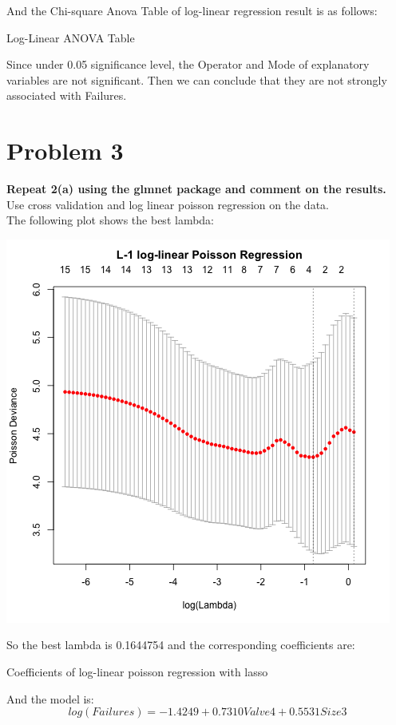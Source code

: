 \documentclass[10pt,letterpaper]{article}
\begin{document}
\begin{enumerate}[leftmargin=0cm,itemindent=.5cm,labelwidth=\itemindent,labelsep=0cm,align=left]
And the Chi-square Anova Table of log-linear regression result is as follows:
\begin{center}
\small{Log-Linear ANOVA Table}
\end{center}
Since under 0.05 significance level, the Operator and Mode of explanatory variables are not significant. Then we can conclude that they are not strongly associated with Failures. 
\end{enumerate}

\section*{Problem 3}
\textbf{Repeat 2(a) using the glmnet package and comment on the results.}\\

Use cross validation and log linear poisson regression on the data. \\
The following plot shows the best lambda:
\begin{center}
\includegraphics[scale=0.7]{glmpoisson_l1_cv}
\end{center}
So the best lambda is 0.1644754 and the corresponding coefficients are:
\begin{center}
\small{Coefficients of log-linear poisson regression with lasso}

\end{center}
And the model is:
\[log(Failures)=-1.4249+0.7310Valve4+0.5531Size3\]
\end{document}
